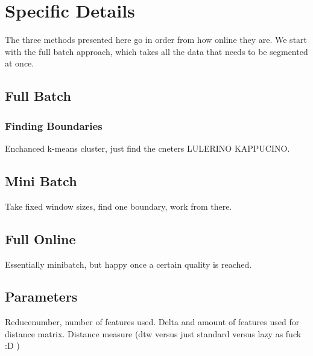 \section{Specific Details}
The three methods presented here go in order from how online they are. We start with the full batch approach, which takes all the data that needs to be segmented at once.
\subsection{Full Batch}
\subsubsection{Finding Boundaries}
Enchanced k-means cluster, just find the cneters LULERINO KAPPUCINO. 
\subsection{Mini Batch}
Take fixed window sizes, find one boundary, work from there. 
\subsection{Full Online}
Essentially minibatch, but happy once a certain quality is reached.
\subsection{Parameters}
Reducenumber, number of features used. Delta and amount of features used for distance matrix. Distance measure (dtw versus just standard versus lazy as fuck :D )
